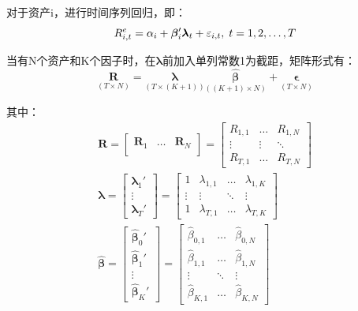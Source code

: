 \documentclass[11pt]{article}
\begin{document}
对于资产i，进行时间序列回归，即：
\begin{equation*}
    R_{i,t}^{e} = \alpha_i + \bm{\beta}_{i}' \bm{\lambda}_t + \varepsilon_{i,t} ,\; t=1,2,\dots,T
\end{equation*}

当有N个资产和K个因子时，在$\bm{\lambda}$前加入单列常数1为截距，矩阵形式有：
\begin{equation*}
    \underset{\scriptscriptstyle{(T \times N)}}{\bm{R}}
    = \underset{\scriptscriptstyle{\left(T \times (K+1)\right)}}{\bm{\lambda}}
    \underset{\scriptscriptstyle{\left((K+1) \times N\right)}}{\hat{\bm{\beta}}} 
    + \underset{\scriptscriptstyle{(T \times N)}}{\bm{\epsilon}}
\end{equation*}

其中：
\begin{gather*}
    \bm{R} = \begin{bmatrix} \bm{R}_1 & \dots & \bm{R}_N \\ \end{bmatrix}
    = \begin{bmatrix} R_{1,1} & \dots & R_{1,N} \\ \vdots & \vdots & \ddots \\ R_{T,1} & \dots & R_{T,N} \end{bmatrix} \\
    \bm{\lambda} = \begin{bmatrix} \bm{\lambda}_{1}' \\ \vdots \\ \bm{\lambda}_{T}' \end{bmatrix}
    = \begin{bmatrix} 1 & \lambda_{1,1} & \dots & \lambda_{1,K} \\ \vdots & \vdots & \ddots & \vdots \\ 1 & \lambda_{T,1} & \dots & \lambda_{T,K} \end{bmatrix} 
    \\
    \hat{\bm{\beta}}
    = \begin{bmatrix} \hat{\bm{\beta}}_{0}' \\ \hat{\bm{\beta}}_{1}' \\ \vdots \\ \hat{\bm{\beta}}_{K}' \end{bmatrix}
    = \begin{bmatrix} \hat{\beta}_{0,1} & \dots & \hat{\beta}_{0,N} \\ \hat{\beta}_{1,1} & \dots & \hat{\beta}_{1,N} \\ \vdots & \ddots & \vdots \\ \hat{\beta}_{K,1} & \dots & \hat{\beta}_{K,N} \end{bmatrix}

\end{gather*}
\end{document}
